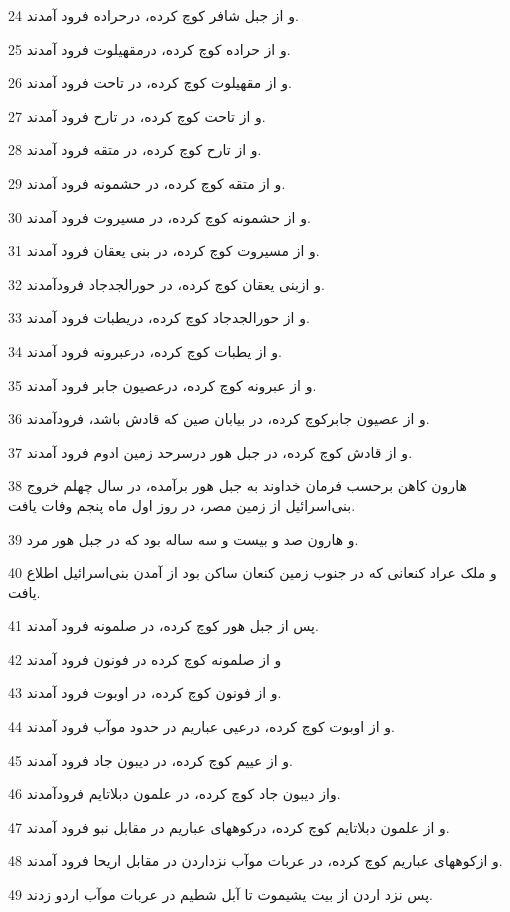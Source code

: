 \par 24 و از جبل شافر کوچ کرده، درحراده فرود آمدند.
\par 25 و از حراده کوچ کرده، درمقهیلوت فرود آمدند.
\par 26 و از مقهیلوت کوچ کرده، در تاحت فرود آمدند.
\par 27 و از تاحت کوچ کرده، در تارح فرود آمدند.
\par 28 و از تارح کوچ کرده، در متقه فرود آمدند.
\par 29 و از متقه کوچ کرده، در حشمونه فرود آمدند.
\par 30 و از حشمونه کوچ کرده، در مسیروت فرود آمدند.
\par 31 و از مسیروت کوچ کرده، در بنی یعقان فرود آمدند.
\par 32 و ازبنی یعقان کوچ کرده، در حورالجدجاد فرودآمدند.
\par 33 و از حورالجدجاد کوچ کرده، دریطبات فرود آمدند.
\par 34 و از یطبات کوچ کرده، درعبرونه فرود آمدند.
\par 35 و از عبرونه کوچ کرده، درعصیون جابر فرود آمدند.
\par 36 و از عصیون جابرکوچ کرده، در بیابان صین که قادش باشد، فرودآمدند.
\par 37 و از قادش کوچ کرده، در جبل هور درسرحد زمین ادوم فرود آمدند.
\par 38 هارون کاهن برحسب فرمان خداوند به جبل هور برآمده، در سال چهلم خروج بنی‌اسرائیل از زمین مصر، در روز اول ماه پنجم وفات یافت.
\par 39 و هارون صد و بیست و سه ساله بود که در جبل هور مرد.
\par 40 و ملک عراد کنعانی که در جنوب زمین کنعان ساکن بود از آمدن بنی‌اسرائیل اطلاع یافت.
\par 41 پس از جبل هور کوچ کرده، در صلمونه فرود آمدند.
\par 42 و از صلمونه کوچ کرده در فونون فرود آمدند
\par 43 و از فونون کوچ کرده، در اوبوت فرود آمدند.
\par 44 و از اوبوت کوچ کرده، درعیی عباریم در حدود موآب فرود آمدند.
\par 45 و از عییم کوچ کرده، در دیبون جاد فرود آمدند.
\par 46 واز دیبون جاد کوچ کرده، در علمون دبلاتایم فرودآمدند.
\par 47 و از علمون دبلاتایم کوچ کرده، درکوههای عباریم در مقابل نبو فرود آمدند.
\par 48 و ازکوههای عباریم کوچ کرده، در عربات موآب نزداردن در مقابل اریحا فرود آمدند. 
\par 49 پس نزد اردن از بیت یشیموت تا آبل شطیم در عربات موآب اردو زدند.
